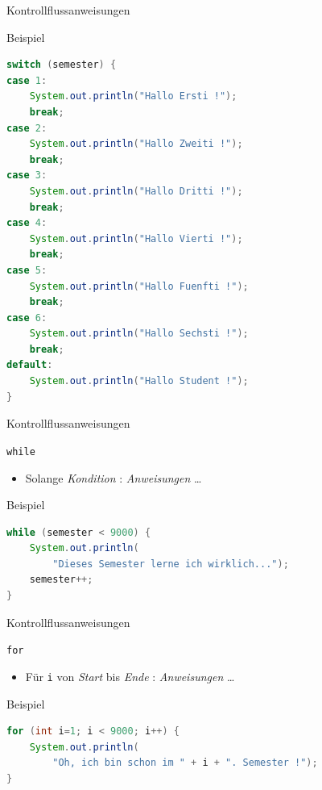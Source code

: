 \documentclass[18pt]{beamer}
\begin{document}
\begin{frame}[fragile]{Kontrollflussanweisungen}
    \begin{exampleblock}{Beispiel}
        \begin{lstlisting}[language=Java,basicstyle=\tiny]
switch (semester) {
case 1:
    System.out.println("Hallo Ersti !");
    break;
case 2:
    System.out.println("Hallo Zweiti !");
    break;
case 3:
    System.out.println("Hallo Dritti !");
    break;
case 4:
    System.out.println("Hallo Vierti !");
    break;
case 5:
    System.out.println("Hallo Fuenfti !");
    break;
case 6:
    System.out.println("Hallo Sechsti !");
    break;
default:
    System.out.println("Hallo Student !");
}
        \end{lstlisting}
    \end{exampleblock}
\end{frame}

\begin{frame}[fragile]{Kontrollflussanweisungen}
    \begin{block}{\texttt{while}}
        \begin{itemize}
            \item Solange \textit{Kondition} : \textit{Anweisungen} \dots
        \end{itemize}
    \end{block}
    \pause
    \begin{exampleblock}{Beispiel}
            \begin{lstlisting}[language=Java]
while (semester < 9000) {
    System.out.println(
        "Dieses Semester lerne ich wirklich...");
    semester++;
}
            \end{lstlisting}
    \end{exampleblock}
\end{frame}

\begin{frame}[fragile]{Kontrollflussanweisungen}
    \begin{block}{\texttt{for}}
        \begin{itemize}
            \item Für \texttt{i} von \textit{Start} bis \textit{Ende} : \textit{Anweisungen} \dots
        \end{itemize}
    \end{block}
    \pause
    \begin{exampleblock}{Beispiel}
            \begin{lstlisting}[language=Java]
for (int i=1; i < 9000; i++) {
    System.out.println(
        "Oh, ich bin schon im " + i + ". Semester !");
}
            \end{lstlisting}
    \end{exampleblock}
\end{frame}
\end{document}
